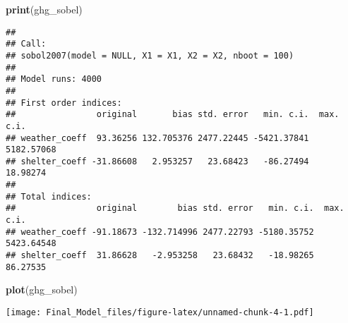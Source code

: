 \documentclass[]{article}
\newenvironment{Shaded}{\begin{snugshade}}{\end{snugshade}}
\newcommand{\KeywordTok}[1]{\textcolor[rgb]{0.13,0.29,0.53}{\textbf{#1}}}
\newcommand{\DataTypeTok}[1]{\textcolor[rgb]{0.13,0.29,0.53}{#1}}
\newcommand{\StringTok}[1]{\textcolor[rgb]{0.31,0.60,0.02}{#1}}
\newcommand{\CommentTok}[1]{\textcolor[rgb]{0.56,0.35,0.01}{\textit{#1}}}
\newcommand{\OperatorTok}[1]{\textcolor[rgb]{0.81,0.36,0.00}{\textbf{#1}}}
\newcommand{\NormalTok}[1]{#1}
\begin{document}
\begin{Shaded}
\begin{Highlighting}[]
\KeywordTok{print}\NormalTok{(ghg_sobel)}
\end{Highlighting}
\end{Shaded}

\begin{verbatim}
## 
## Call:
## sobol2007(model = NULL, X1 = X1, X2 = X2, nboot = 100)
## 
## Model runs: 4000 
## 
## First order indices:
##                original       bias std. error   min. c.i.  max. c.i.
## weather_coeff  93.36256 132.705376 2477.22445 -5421.37841 5182.57068
## shelter_coeff -31.86608   2.953257   23.68423   -86.27494   18.98274
## 
## Total indices:
##                original        bias std. error   min. c.i.  max. c.i.
## weather_coeff -91.18673 -132.714996 2477.22793 -5180.35752 5423.64548
## shelter_coeff  31.86628   -2.953258   23.68432   -18.98265   86.27535
\end{verbatim}

\begin{Shaded}
\begin{Highlighting}[]
\KeywordTok{plot}\NormalTok{(ghg_sobel)}
\end{Highlighting}
\end{Shaded}

\texttt{[image: Final\_Model\_files/figure-latex/unnamed-chunk-4-1.pdf]}

\begin{Shaded}
\end{Shaded}
\end{document}
